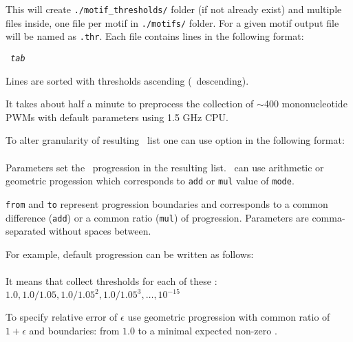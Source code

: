 This will create \texttt{./motif\_thresholds/} folder (if not already exist) and multiple files inside, one file per motif in \texttt{./motifs/} folder. For a given motif output file will be named as \texttt{.thr}.
Each file contains lines in the following format:

\texttt{ \textit{tab} }

Lines are sorted with thresholds ascending (\pvalue\ descending).

It takes about half a minute to preprocess the collection of $\sim$400 mononucleotide PWMs with default
parameters using 1.5 GHz CPU.

To alter granularity of resulting \pvalues\ list one can use  option in the following format:\\
\\

Parameters set the \pvalues\ progression in the resulting list. \pvalues\ can use arithmetic or geometric progession which corresponds to \texttt{add} or \texttt{mul} value of \texttt{mode}.

\texttt{from} and \texttt{to} represent progression boundaries and  corresponds to a common difference (\texttt{add}) or a common ratio (\texttt{mul}) of progression. Parameters are comma-separated without spaces between.

For example, default progression can be written as follows:\\
\\

It means that  collect thresholds for
each of these \pvalues: $1.0, 1.0/1.05, 1.0/1.05^2, 1.0/1.05^3,\ldots,
10^{-15}$

To specify relative error of $\epsilon$ use geometric progression with common ratio of $1+\epsilon$ and boundaries: from $1.0$ to a minimal expected non-zero \pvalue.
